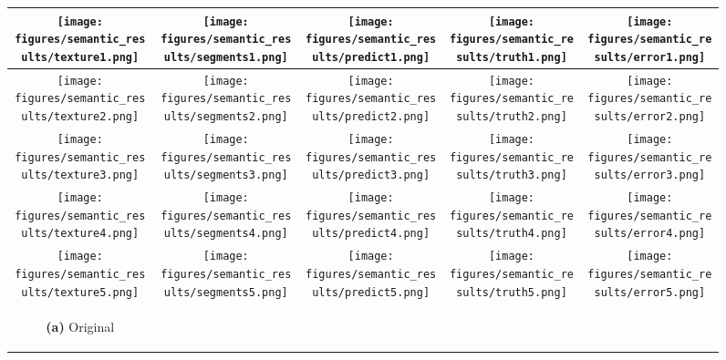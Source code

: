 \begin{figure}[H]
	\begin{adjustwidth}{-3cm}{-3cm}
		\centering
		\begin{tabular}{ccccc}	
			\texttt{[image: figures/semantic\_results/texture1.png]}&
			\texttt{[image: figures/semantic\_results/segments1.png]}&
			\texttt{[image: figures/semantic\_results/predict1.png]}&
			\texttt{[image: figures/semantic\_results/truth1.png]}&
			\texttt{[image: figures/semantic\_results/error1.png]}\\
			\midrule
			\texttt{[image: figures/semantic\_results/texture2.png]}&
			\texttt{[image: figures/semantic\_results/segments2.png]}&
			\texttt{[image: figures/semantic\_results/predict2.png]}&
			\texttt{[image: figures/semantic\_results/truth2.png]}&
			\texttt{[image: figures/semantic\_results/error2.png]}\\
			\midrule
			\texttt{[image: figures/semantic\_results/texture3.png]}&
			\texttt{[image: figures/semantic\_results/segments3.png]}&
			\texttt{[image: figures/semantic\_results/predict3.png]}&
			\texttt{[image: figures/semantic\_results/truth3.png]}&
			\texttt{[image: figures/semantic\_results/error3.png]}\\
			\midrule
			\texttt{[image: figures/semantic\_results/texture4.png]}&
			\texttt{[image: figures/semantic\_results/segments4.png]}&
			\texttt{[image: figures/semantic\_results/predict4.png]}&
			\texttt{[image: figures/semantic\_results/truth4.png]}&
			\texttt{[image: figures/semantic\_results/error4.png]}\\		
			\midrule
			\texttt{[image: figures/semantic\_results/texture5.png]}&
			\texttt{[image: figures/semantic\_results/segments5.png]}&
			\texttt{[image: figures/semantic\_results/predict5.png]}&
			\texttt{[image: figures/semantic\_results/truth5.png]}&
			\texttt{[image: figures/semantic\_results/error5.png]}\\	
			\begin{footnotesize} \textbf{(a)} Original \end{footnotesize}&

\end{tabular}
\end{adjustwidth}
\end{figure}
